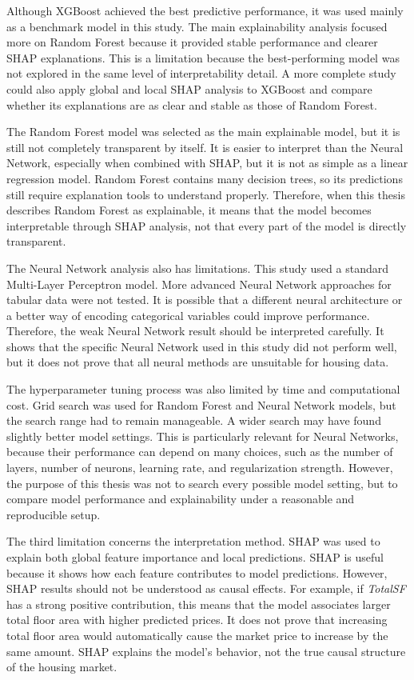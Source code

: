 \documentclass[12pt,a4paper,oneside,openany]{book}
\begin{document}
Although XGBoost achieved the best predictive performance, it was used mainly as a benchmark model in this study. The main explainability analysis focused more on Random Forest because it provided stable performance and clearer SHAP explanations. This is a limitation because the best-performing model was not explored in the same level of interpretability detail. A more complete study could also apply global and local SHAP analysis to XGBoost and compare whether its explanations are as clear and stable as those of Random Forest.

The Random Forest model was selected as the main explainable model, but it is still not completely transparent by itself. It is easier to interpret than the Neural Network, especially when combined with SHAP, but it is not as simple as a linear regression model. Random Forest contains many decision trees, so its predictions still require explanation tools to understand properly. Therefore, when this thesis describes Random Forest as explainable, it means that the model becomes interpretable through SHAP analysis, not that every part of the model is directly transparent.

The Neural Network analysis also has limitations. This study used a standard Multi-Layer Perceptron model. More advanced Neural Network approaches for tabular data were not tested. It is possible that a different neural architecture or a better way of encoding categorical variables could improve performance. Therefore, the weak Neural Network result should be interpreted carefully. It shows that the specific Neural Network used in this study did not perform well, but it does not prove that all neural methods are unsuitable for housing data.

The hyperparameter tuning process was also limited by time and computational cost. Grid search was used for Random Forest and Neural Network models, but the search range had to remain manageable. A wider search may have found slightly better model settings. This is particularly relevant for Neural Networks, because their performance can depend on many choices, such as the number of layers, number of neurons, learning rate, and regularization strength. However, the purpose of this thesis was not to search every possible model setting, but to compare model performance and explainability under a reasonable and reproducible setup.

The third limitation concerns the interpretation method. SHAP was used to explain both global feature importance and local predictions. SHAP is useful because it shows how each feature contributes to model predictions. However, SHAP results should not be understood as causal effects. For example, if \textit{TotalSF} has a strong positive contribution, this means that the model associates larger total floor area with higher predicted prices. It does not prove that increasing total floor area would automatically cause the market price to increase by the same amount. SHAP explains the model's behavior, not the true causal structure of the housing market.
\end{document}
